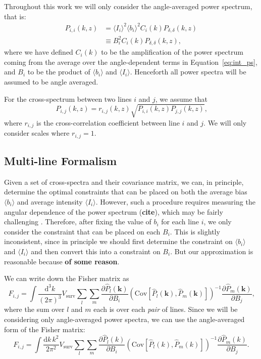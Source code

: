 \documentclass{aastex62}
\newcommand{\beq}{\begin{equation}}
\newcommand{\eeq}{\end{equation}}
\newcommand{\Cov}[2]{\mathrm{Cov}[#1,#2]}
\newcommand{\avg}[1]{\ensuremath{\langle #1 \rangle}}
\newcommand{\bi}{\ensuremath{\avg{b_i}}}
\newcommand{\Ii}{\ensuremath{\avg{I_i}}}
\begin{document}
Throughout this work we will only consider the angle-averaged power spectrum, that is:
\beq\label{eq:int_ps}
\begin{split}
P_{i,i}(k, z) &= \avg{I_i}^2 \avg{b_i}^2 C_i(k) P_{\delta, \delta}(k, z)\\
                   &\equiv B_i^2 C_i(k) P_{\delta, \delta}(k, z)\text{,}
\end{split}
\eeq
where we have defined $C_i(k)$ to be the amplification of the power spectrum
coming from the average over the angle-dependent terms in
Equation~\eqref{eq:int_ps}, and $B_i$ to be the product of $\avg{b_i}$ and
$\avg{I_i}$. Henceforth all power spectra will be assumed to be angle
averaged.

For the cross-spectrum between two lines $i$ and $j$, we assume that
\beq\label{eq:cross_spec}
P_{i,j}(k, z) = r_{i,j}(k, z) \sqrt{P_{i,i}(k, z) P_{j,j}(k, z)}\text{,}
\eeq
where $r_{i,j}$ is the cross-correlation coefficient between line $i$ and $j$.
We will only consider scales where $r_{i,j} = 1$.

\subsection{Multi-line Formalism}\label{ssec:multi_line}
Given a set of cross-spectra and their covariance matrix, we can, in
principle, determine the optimal constraints that can be placed on both the
average bias $\avg{b_i}$ and average intensity $\avg{I_i}$. However, such a
procedure requires measuring the angular dependence of the power spectrum
({\bf cite}), which may be fairly challenging \citep{2019arXiv190500209C}.
Therefore, after fixing the value of $b_i$ for each line $i$, we only consider
the constraint that can be placed on each $B_i$. This is slightly
inconsistent, since in principle we should first determine the constraint on
$\bi$ and $\Ii$ and then convert this into a constraint on $B_i$. But our
approximation is reasonable because {\bf of some reason}.

We can write down the Fisher matrix as
\beq\label{eq:fisher}
F_{i,j} = 
\int \frac{\text{d}^3k}{(2\pi)^3} V_{\text{surv}}
\sum_{l} \sum_{m}
\frac{\partial \hat{P}_{l}(\bm{k})}{\partial B_i}
\left(\Cov{\hat{P}_{l}(\bm{k})}{\hat{P}_{m}(\bm{k})}\right)^{-1}
\frac{\partial \hat{P}_{m}(\bm{k})}{\partial B_j}\text{,}
\eeq
where the sum over $l$ and $m$ each is over each \emph{pair} of lines. Since
we will be considering only angle-averaged power spectra, we can use the
angle-averaged form of the Fisher matrix:
\beq\label{eq:fisher}
F_{i,j} = 
\int \frac{\text{d}k\,k^2}{2\pi^2} V_{\text{surv}}
\sum_{l} \sum_{m}
\frac{\partial \hat{P}_{l}(k)}{\partial B_i}
\left(\Cov{\hat{P}_{l}(k)}{\hat{P}_{m}(k)}\right)^{-1}
\frac{\partial \hat{P}_{m}(k)}{\partial B_j}\text{.}
\eeq
\end{document}
